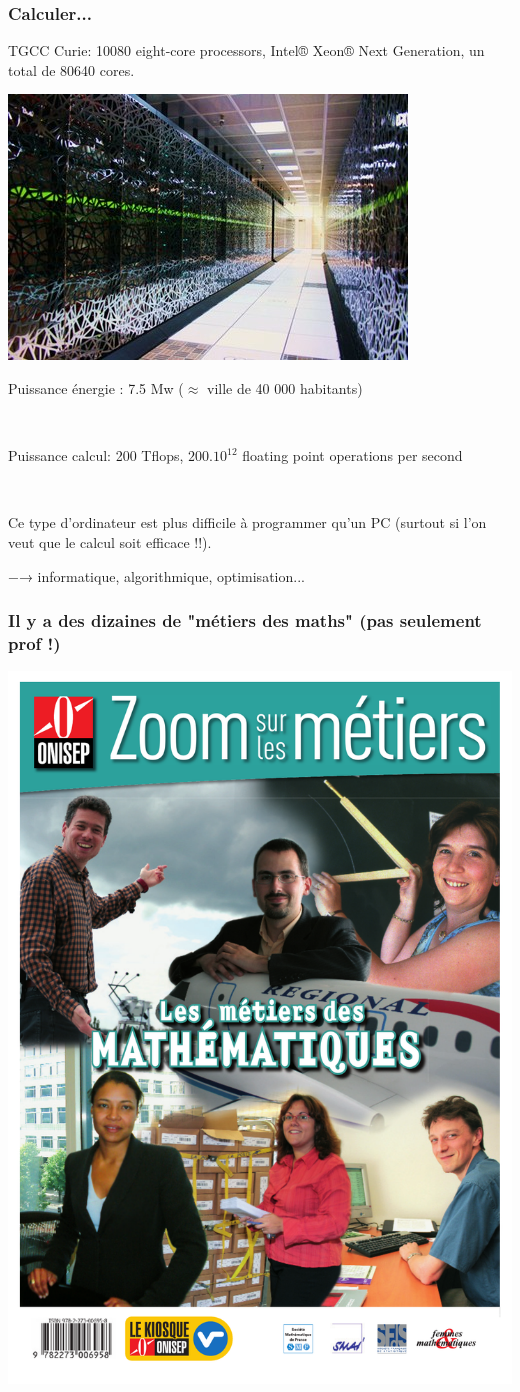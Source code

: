 \documentclass[slideopt,A4]{beamer}
\begin{document}
\begin{frame}
  \frametitle{Calculer...}
  TGCC Curie: 10080 eight-core processors, Intel® Xeon® Next
  Generation, un total de 80640 cores.
  \centerline{\includegraphics[width=0.5\linewidth]{Figures/tgcc_curie.jpeg}}
  \centerline{Puissance énergie : 7.5 Mw ($\approx$ ville de 40 000 habitants)}\\
  \centerline{Puissance calcul: 200 Tflops, $200.10^{12}$ floating point
    operations per second}\\
  \begin{center}
    Ce type d’ordinateur est plus difficile à programmer qu’un PC (surtout si l’on veut que le calcul soit efficace !!).
  \end{center}
    \centerline{\alert{−→ informatique, algorithmique, optimisation...}}
\end{frame}

%
\begin{frame}
\frametitle{Il y a des dizaines de "métiers des maths" {\small (pas seulement prof !) }}
%
\begin{center}
\includegraphics[width=0.4\linewidth]{onisep.pdf}
\end{center}
%
\centerline{}
%
\end{frame}
\end{document}
